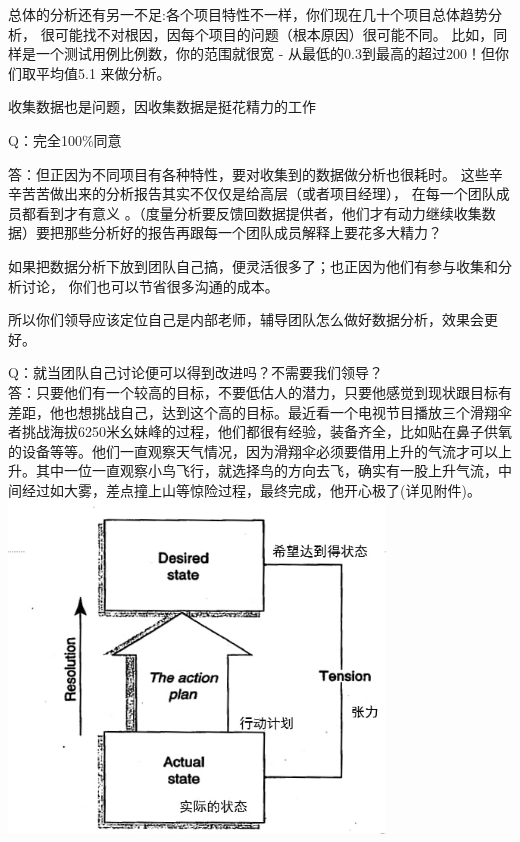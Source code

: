 总体的分析还有另一不足:各个项目特性不一样，你们现在几十个项目总体趋势分析，
很可能找不对根因，因每个项目的问题（根本原因）很可能不同。
比如，同样是一个测试用例比例数，你的范围就很宽 -
从最低的0.3到最高的超过200！但你们取平均值5.1 来做分析。

收集数据也是问题，因收集数据是挺花精力的工作

Q：完全100\%同意

答：但正因为不同项目有各种特性，要对收集到的数据做分析也很耗时。
这些辛辛苦苦做出来的分析报告其实不仅仅是给高层（或者项目经理），
在每一个团队成员都看到才有意义
。（度量分析要反馈回数据提供者，他们才有动力继续收集数据）要把那些分析好的报告再跟每一个团队成员解释上要花多大精力？

如果把数据分析下放到团队自己搞，便灵活很多了；也正因为他们有参与收集和分析讨论，
你们也可以节省很多沟通的成本。

所以你们领导应该定位自己是内部老师，辅导团队怎么做好数据分析，效果会更好。

Q：就当团队自己讨论便可以得到改进吗？不需要我们领导？\\
答：只要他们有一个较高的目标，不要低估人的潜力，只要他感觉到现状跟目标有差距，他也想挑战自己，达到这个高的目标。最近看一个电视节目播放三个滑翔伞者挑战海拔6250米幺妹峰的过程，他们都很有经验，装备齐全，比如贴在鼻子供氧的设备等等。他们一直观察天气情况，因为滑翔伞必须要借用上升的气流才可以上升。其中一位一直观察小鸟飞行，就选择鸟的方向去飞，确实有一股上升气流，中间经过如大雾，差点撞上山等惊险过程，最终完成，他开心极了(详见附件)。\\

\includegraphics[width=10cm]{Tension2ImproveScreenshot_2021-12-27_204553.jpg}

